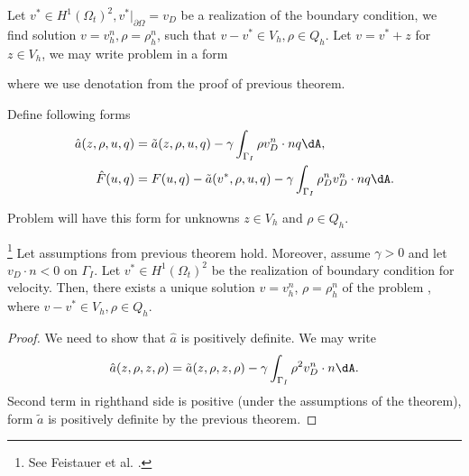 Let $v^* \in H^1(\Omega_t)^2, v^*|_{\partial\Omega}=v_D$ be a realization of the boundary condition, 
we find solution $v=v_h^n,\rho=\rho_h^n$, such that
$v-v^* \in V_h,\rho\in Q_h$. Let $v=v^*+z$ for $z\in V_h$, we may write
problem  in a form 


where we use denotation from the proof of previous theorem.

Define following forms
\[
\begin{split}
\hat a(z,\rho,u,q) &= \tilde a(z,\rho,u,q) 
- \gamma \int_{\Gamma_I}{\rho v_D^n \cdot nq}\dA, \\
\hat F(u,q) &= F(u,q) - \tilde a(v^*,\rho,u,q)
- \gamma \int_{\Gamma_I}{\rho_D^n v_D^n \cdot nq}\dA. 
\end{split}
\]

Problem  will have this form
for unknowns $z\in V_h$ and $\rho\in Q_h$.


\footnote{See Feistauer et al. \cite[p. 374]{feistauer}.}
Let assumptions from previous theorem hold. Moreover, assume $\gamma>0$ and let
$v_D\cdot n<0$ on $\Gamma_I$. Let $v^* \in H^1(\Omega_t)^2$
be the realization of boundary condition for velocity. Then, there exists a unique solution 
$v=v_h^n$, $\rho=\rho_h^n$ of the problem
, 
where $v-v^*\in V_h, \rho\in Q_h$. 
\begin{proof}

We need to show that $\hat a$ is positively definite.
We may write $$\hat a(z,\rho,z,\rho) = \tilde a(z,\rho,z,\rho) - 
\gamma \int_{\Gamma_I}{\rho^2 v_D^n \cdot n}\dA.$$
Second term in righthand side is positive (under the assumptions of the theorem), form  $\tilde a$ is
positively definite by the previous theorem.
\end{proof}


